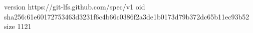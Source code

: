 version https://git-lfs.github.com/spec/v1
oid sha256:61e60172753463d3231f6c4b66c0386f2a3de1b0173d79b372dc65b11ec93b52
size 1121
